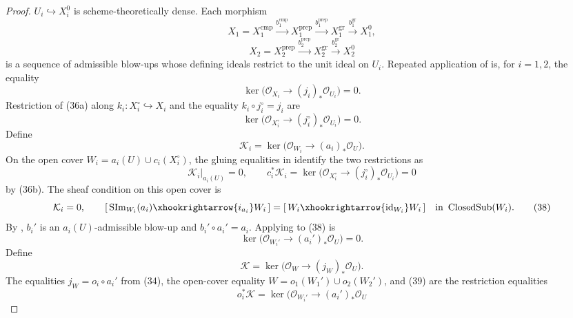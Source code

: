 \begin{proof}
  $U_i\hookrightarrow X_i^0$ is scheme-theoretically dense.  Each morphism
  \[
    X_1=X_1^{\mathrm{cmp}}
      \xrightarrow{b_1^{\mathrm{cmp}}}X_1^{\mathrm{prep}}
      \xrightarrow{b_1^{\mathrm{prep}}}X_1^{\mathrm{gr}}
      \xrightarrow{b_1^{\mathrm{gr}}}X_1^0,
  \]
  \[
    X_2=X_2^{\mathrm{prep}}
      \xrightarrow{b_2^{\mathrm{prep}}}X_2^{\mathrm{gr}}
      \xrightarrow{b_2^{\mathrm{gr}}}X_2^0
  \]
  is a sequence of admissible blow-ups whose defining ideals restrict to the
  unit ideal on $U_i$.  Repeated application of
   is, for $i=1,2$, the equality
  \[
    \ker\bigl(
      \mathcal O_{X_i}\longrightarrow(j_i)_*\mathcal O_{U_i}
    \bigr)=0.                                                     \tag{36a}
  \]
  Restriction of (36a) along $k_i\colon X_i^\circ\hookrightarrow X_i$ and
  the equality $k_i\circ j_i^\circ=j_i$ are
  \[
    \ker\bigl(
      \mathcal O_{X_i^\circ}
        \longrightarrow(j_i^\circ)_*\mathcal O_{U_i}
    \bigr)=0.                                                     \tag{36b}
  \]
  Define
  \[
    \mathcal K_i
      =\ker\bigl(
          \mathcal O_{W_i}\longrightarrow(a_i)_*\mathcal O_U
        \bigr).
  \]
  On the open cover $W_i=a_i(U)\cup c_i(X_i^\circ)$, the gluing equalities
  in  identify the two
  restrictions as
  \[
    \mathcal K_i|_{a_i(U)}=0,
    \qquad
    c_i^*\mathcal K_i
      =\ker\bigl(
          \mathcal O_{X_i^\circ}
            \longrightarrow(j_i^\circ)_*\mathcal O_{U_i}
        \bigr)=0                                                  \tag{37}
  \]
  by (36b).  The sheaf condition on this open cover is
  \[
    \mathcal K_i=0,
    \qquad
    [\,\operatorname{SIm}_{W_i}(a_i)\xhookrightarrow{i_{a_i}}W_i\,]
      =[\,W_i\xhookrightarrow{\operatorname{id}_{W_i}}W_i\,]
      \quad\text{in }\operatorname{ClosedSub}(W_i).              \tag{38}
  \]
  By , $b_i'$ is an
  $a_i(U)$-admissible blow-up and
  $b_i'\circ a_i'=a_i$.  Applying
   to (38) is
  \[
    \ker\bigl(
      \mathcal O_{W_i'}\longrightarrow(a_i')_*\mathcal O_U
    \bigr)=0.                                                     \tag{39}
  \]
  Define
  \[
    \mathcal K
      =\ker\bigl(
          \mathcal O_W\longrightarrow(j_W)_*\mathcal O_U
        \bigr).
  \]
  The equalities $j_W=o_i\circ a_i'$ from (34), the open-cover equality
  $W=o_1(W_1')\cup o_2(W_2')$, and (39) are the restriction equalities
  \[
    o_i^*\mathcal K
      =\ker\bigl(
          \mathcal O_{W_i'}\longrightarrow(a_i')_*\mathcal O_U
\]
\end{proof}
